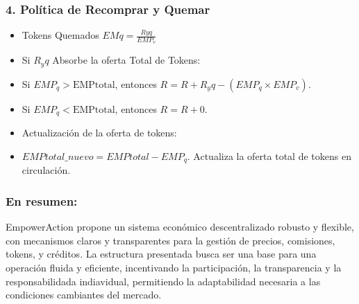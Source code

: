 \documentclass{article}
\begin{document}
\subsubsection*{4. Política de Recomprar y Quemar}
\begin{itemize}
    \item Tokens Quemados \(EMq = \frac{Ryq}{EMP_v}\)
    \item Si \(R_yq\) Absorbe la oferta Total de Tokens:
    \item Si \(EMP_q > \text{EMPtotal}\), entonces \(R = R + R_yq - (EMP_q \times EMP_v)\).
    \item Si \(EMP_q < \text{EMPtotal}\), entonces \(R = R + 0\).
    \item Actualización de la oferta de tokens:
    \item \(EMPtotal\_nuevo = EMPtotal - EMP_q\). Actualiza la oferta total de tokens en circulación.
\end{itemize}


\subsubsection*{En resumen:}
EmpowerAction propone un sistema económico descentralizado robusto y flexible, con mecanismos claros y transparentes para la gestión de precios, comisiones, tokens, y créditos. La estructura presentada busca ser una base para una operación fluida y eficiente, incentivando la participación, la transparencia y la responsabilidada indiavidual, permitiendo la adaptabilidad necesaria a las condiciones cambiantes del mercado. 
\end{document}
